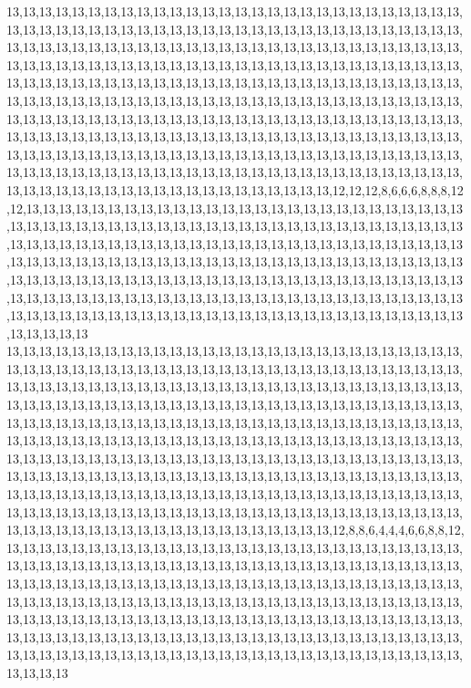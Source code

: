 13,13,13,13,13,13,13,13,13,13,13,13,13,13,13,13,13,13,13,13,13,13,13,13,13,13,13,13,13,13,13,13,13,13,13,13,13,13,13,13,13,13,13,13,13,13,13,13,13,13,13,13,13,13,13,13,13,13,13,13,13,13,13,13,13,13,13,13,13,13,13,13,13,13,13,13,13,13,13,13,13,13,13,13,13,13,13,13,13,13,13,13,13,13,13,13,13,13,13,13,13,13,13,13,13,13,13,13,13,13,13,13,13,13,13,13,13,13,13,13,13,13,13,13,13,13,13,13,13,13,13,13,13,13,13,13,13,13,13,13,13,13,13,13,13,13,13,13,13,13,13,13,13,13,13,13,13,13,13,13,13,13,13,13,13,13,13,13,13,13,13,13,13,13,13,13,13,13,13,13,13,13,13,13,13,13,13,13,13,13,13,13,13,13,13,13,13,13,13,13,13,13,13,13,13,13,13,13,13,13,13,13,13,13,13,13,13,13,13,13,13,13,13,13,13,13,13,13,13,13,13,13,13,13,13,13,13,13,13,13,13,13,13,13,13,13,13,13,13,13,13,13,13,13,13,13,13,13,13,13,13,13,13,13,13,13,13,13,13,13,13,13,13,13,13,13,13,13,13,13,13,13,13,13,13,13,13,13,13,13,13,13,13,13,13,13,13,13,13,13,12,12,12,8,6,6,6,8,8,8,12,12,13,13,13,13,13,13,13,13,13,13,13,13,13,13,13,13,13,13,13,13,13,13,13,13,13,13,13,13,13,13,13,13,13,13,13,13,13,13,13,13,13,13,13,13,13,13,13,13,13,13,13,13,13,13,13,13,13,13,13,13,13,13,13,13,13,13,13,13,13,13,13,13,13,13,13,13,13,13,13,13,13,13,13,13,13,13,13,13,13,13,13,13,13,13,13,13,13,13,13,13,13,13,13,13,13,13,13,13,13,13,13,13,13,13,13,13,13,13,13,13,13,13,13,13,13,13,13,13,13,13,13,13,13,13,13,13,13,13,13,13,13,13,13,13,13,13,13,13,13,13,13,13,13,13,13,13,13,13,13,13,13,13,13,13,13,13,13,13,13,13,13,13,13,13,13,13,13,13,13,13,13,13,13,13,13,13,13,13,13,13,13,13,13,13,13,13,13,13,13,13
13,13,13,13,13,13,13,13,13,13,13,13,13,13,13,13,13,13,13,13,13,13,13,13,13,13,13,13,13,13,13,13,13,13,13,13,13,13,13,13,13,13,13,13,13,13,13,13,13,13,13,13,13,13,13,13,13,13,13,13,13,13,13,13,13,13,13,13,13,13,13,13,13,13,13,13,13,13,13,13,13,13,13,13,13,13,13,13,13,13,13,13,13,13,13,13,13,13,13,13,13,13,13,13,13,13,13,13,13,13,13,13,13,13,13,13,13,13,13,13,13,13,13,13,13,13,13,13,13,13,13,13,13,13,13,13,13,13,13,13,13,13,13,13,13,13,13,13,13,13,13,13,13,13,13,13,13,13,13,13,13,13,13,13,13,13,13,13,13,13,13,13,13,13,13,13,13,13,13,13,13,13,13,13,13,13,13,13,13,13,13,13,13,13,13,13,13,13,13,13,13,13,13,13,13,13,13,13,13,13,13,13,13,13,13,13,13,13,13,13,13,13,13,13,13,13,13,13,13,13,13,13,13,13,13,13,13,13,13,13,13,13,13,13,13,13,13,13,13,13,13,13,13,13,13,13,13,13,13,13,13,13,13,13,13,13,13,13,13,13,13,13,13,13,13,13,13,13,13,13,13,13,13,13,13,13,13,13,13,13,13,13,13,13,13,13,13,13,13,13,12,8,8,6,4,4,4,6,6,8,8,12,13,13,13,13,13,13,13,13,13,13,13,13,13,13,13,13,13,13,13,13,13,13,13,13,13,13,13,13,13,13,13,13,13,13,13,13,13,13,13,13,13,13,13,13,13,13,13,13,13,13,13,13,13,13,13,13,13,13,13,13,13,13,13,13,13,13,13,13,13,13,13,13,13,13,13,13,13,13,13,13,13,13,13,13,13,13,13,13,13,13,13,13,13,13,13,13,13,13,13,13,13,13,13,13,13,13,13,13,13,13,13,13,13,13,13,13,13,13,13,13,13,13,13,13,13,13,13,13,13,13,13,13,13,13,13,13,13,13,13,13,13,13,13,13,13,13,13,13,13,13,13,13,13,13,13,13,13,13,13,13,13,13,13,13,13,13,13,13,13,13,13,13,13,13,13,13,13,13,13,13,13,13,13,13,13,13,13,13,13,13,13,13,13,13,13,13,13,13,13,13
